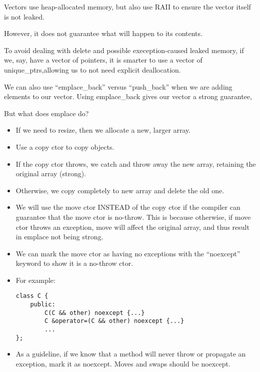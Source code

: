 \documentclass{article}
\begin{document}
\item Vectors use heap-allocated memory, but also use RAII to ensure the vector itself is not leaked.
\item However, it does not guarantee what will happen to its contents.
\item To avoid dealing with delete and possible exeception-caused leaked memory, if we, say, have a vector of pointers, it is smarter to use a vector of unique_ptrs,allowing us to not need explicit deallocation.
\item We can also use ``emplace_back'' versus ``push_back'' when we are adding elements to our vector.  Using emplace_back gives our vector a strong guarantee,
\item But what does emplace do?
\begin{itemize}
\item If we need to resize, then we allocate a new, larger array.
\item Use a copy ctor to copy objects.
\item If the copy ctor throws, we catch and throw away the new array, retaining the original array (strong).
\item Otherwise, we copy completely to new array and delete the old one.
\item We will use the move ctor INSTEAD of the copy ctor if the compiler can guarantee that the move ctor is no-throw.  This is because otherwise, if move ctor throws an exception, move will affect the original array, and thus result in emplace not being strong.
\item We can mark the move ctor as having no exceptions with the ``noexcept'' keyword to show it is a no-throw ctor.
\item For example:
\begin{lstlisting}
class C {
    public:
        C(C && other) noexcept {...}
        C &operator=(C && other) noexcept {...}
        ...
};
\end{lstlisting}
\item As a guideline, if we know that a method will never throw or propagate an exception, mark it as noexcept.  Moves and swaps should be noexcept.
\end{itemize}
\end{document}
